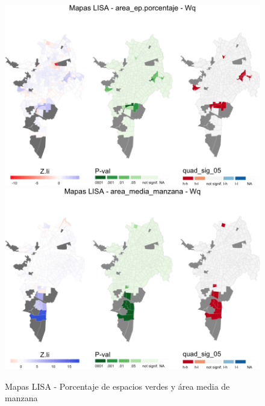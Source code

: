 \documentclass[12pt,]{book}
\begin{document}
\begin{figure}
\includegraphics[width=1\linewidth]{tesis-unigis_files/figure-latex/lisa-areaep-amm-1} \includegraphics[width=1\linewidth]{tesis-unigis_files/figure-latex/lisa-areaep-amm-2} \caption{Mapas LISA - Porcentaje de espacios verdes y área media de manzana}\label{fig:lisa-areaep-amm}
\end{figure}
\end{document}
